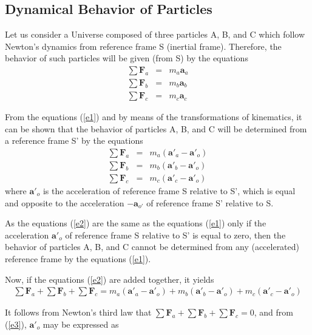 \documentclass[12pt]{article}
\newcommand{\vA}{\mathbf{a}}
\newcommand{\vF}{\mathbf{F}}
\newcommand{\mM}{m}
\newcommand{\rt}{'}
\newcommand{\ra}{_a}
\newcommand{\rb}{_b}
\newcommand{\rc}{_c}
\newcommand{\ro}{_o}
\newcommand{\rot}{_{o'}}
\begin{document}
\newpage \baselineskip=14.5pt

{\centering\subsection{Dynamical Behavior of Particles}}

\par Let us consider a Universe composed of three particles A, B, and C which follow Newton's dynamics from reference frame S (inertial frame). Therefore, the behavior of such particles will be given (from S) by the equations
\begin{eqnarray}
\sum \vF\ra & = & \mM\ra\vA\ra \nonumber \\
\sum \vF\rb & = & \mM\rb\vA\rb \label{e1} \\
\sum \vF\rc & = & \mM\rc\vA\rc \nonumber
\end{eqnarray}
\par From the equations (\ref{e1}) and by means of the transformations of kinematics, it can be shown that the behavior of particles A, B, and C will be determined from a reference frame S' by the equations
\begin{eqnarray}
\sum \vF\ra & = & \mM\ra(\vA\rt\ra - \vA\rt\ro) \nonumber \\
\sum \vF\rb & = & \mM\rb(\vA\rt\rb - \vA\rt\ro) \label{e2} \\
\sum \vF\rc & = & \mM\rc(\vA\rt\rc - \vA\rt\ro) \nonumber
\end{eqnarray}
\noindent where $\vA\rt\ro$ is the acceleration of reference frame S relative to S', which is equal and opposite to the acceleration $-\vA\rot$ of reference frame S' relative to S.
\par As the equations (\ref{e2}) are the same as the equations (\ref{e1}) only if the acceleration $\vA\rt\ro$ of reference frame S relative to S' is equal to zero, then the behavior of particles A, B, and C cannot be determined from any (accelerated) reference frame by the equations (\ref{e1}).
\par Now, if the equations (\ref{e2}) are added together, it yields
\begin{eqnarray}
\sum \vF\ra + \sum \vF\rb + \sum \vF\rc = \mM\ra(\vA\rt\ra - \vA\rt\ro) + \mM\rb(\vA\rt\rb - \vA\rt\ro) + \mM\rc(\vA\rt\rc - \vA\rt\ro) \label{e3}
\end{eqnarray}
\par It follows from Newton's third law that $\sum \vF\ra + \sum \vF\rb + \sum \vF\rc = 0$, and from (\ref{e3}), $\vA\rt\ro$ may be expressed as
\end{document}
